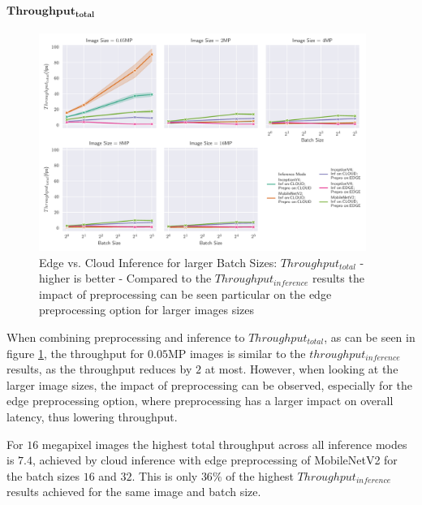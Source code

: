 \paragraph{$\mathbf{Throughput_{total}}$}
\begin{figure}[!htb]
\centering
\includegraphics[width=0.95\textwidth]{./Bilder/single_plots/batch_size_plots/Effects_of_Batch_size_Total_Throughput_(Preprocessing_+_Inference).pdf}
\caption[Edge vs. Cloud Inference for larger Batch Sizes:  $Throughput_{total}$ - higher is better]{Edge vs. Cloud Inference for larger Batch Sizes:  $Throughput_{total}$ - higher is better - Compared to the $Throughput_{inference}$ results the impact of preprocessing can be seen particular on the edge preprocessing option for larger images sizes}
\label{fig:BatchSizeTotalThroughput}
\end{figure}

When combining preprocessing and inference to $Throughput_{total}$, as can be seen in figure \ref{fig:BatchSizeTotalThroughput}, the throughput for $0.05$MP images is similar to the $throughput_{inference}$ results, as the throughput reduces by $2$ at most.
However, when looking at the larger image sizes, the impact of preprocessing can be observed, especially for the edge preprocessing option, where preprocessing has a larger impact on overall latency, thus lowering throughput.

For $16$ megapixel images the highest total throughput across all inference modes is $7.4$, achieved by cloud inference with edge preprocessing of MobileNetV2 for the batch sizes $16$ and $32$.
This is only $36\%$ of the highest $Throughput_{inference}$  results achieved for the same image and batch size.



